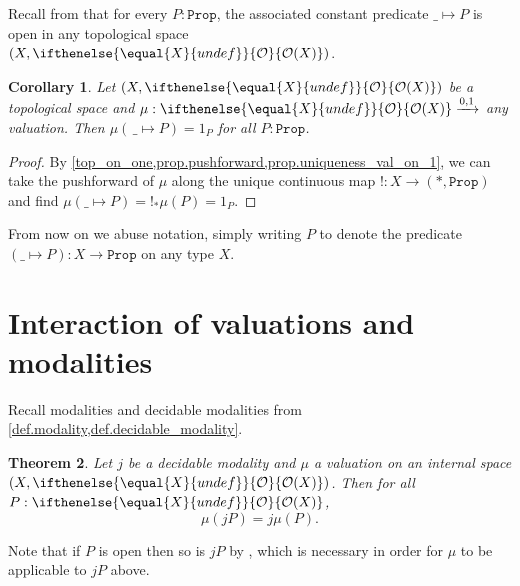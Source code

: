 \documentclass[reqno,11pt]{amsproc}
\theoremstyle{plain}
\newtheorem{theorem}{Theorem}[section]
\newtheorem{corollary}[theorem]{Corollary}
\theoremstyle{definition}
\newcommand{\Const}[1]{\mathtt{#1}}
\renewcommand{\to}[1][]{\xrightarrow{#1}}
\newcommand{\ind}[1]{1_{#1}}			%
\newcommand{\prop}{\Const{Prop}}
\newcommand{\Op}[1][undef]{\ifthenelse{\equal{#1}{undef}}{\mathcal{O}}{\mathcal{O}(#1)}}
\numberwithin{equation}{section}
\begin{document}
Recall from  that for every $P : \prop$, the associated constant predicate $\_ \mapsto P$ is open in any topological space $(X,\Op[X])$. 

\begin{corollary}\label{cor.val_const_indicator}
	Let $(X,\Op[X])$ be a topological space and $\mu : \Op[X] \to [0,1]$ any valuation. Then $\mu(\,\_\mapsto P) = \ind{P}$ for all $P : \prop$.
\end{corollary}

\begin{proof}
	By \cref{top_on_one,prop.pushforward,prop.uniqueness_val_on_1}, we can take the pushforward of $\mu$ along the unique continuous map $!\colon X\to (*,\prop)$ and find $\mu(\_\mapsto P)=!_*\mu(P)=\ind{P}$.
\end{proof}

From now on we abuse notation, simply writing $P$ to denote the predicate $(\_\mapsto P)\colon X\to\prop$ on any type $X$.

\section{Interaction of valuations and modalities}


Recall modalities and decidable modalities from \cref{def.modality,def.decidable_modality}. 
\begin{theorem}
	\label{vals_vs_modalities}
	Let $j$ be a decidable modality and $\mu$ a valuation on an internal space $(X,\Op[X])$. Then for all $P : \Op[X]$,
	\[
		\mu(jP) = j \mu(P).	
	\]
\end{theorem}

Note that if $P$ is open then so is $jP$ by , which is necessary in order for $\mu$ to be applicable to $jP$ above.
\end{document}
